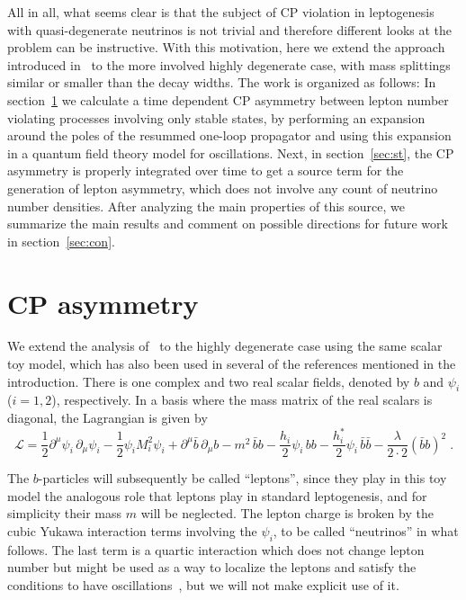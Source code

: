 \documentclass[11pt,a4paper]{article}
\begin{document}
All in all, what seems clear is that the subject of CP violation in leptogenesis with quasi-degenerate neutrinos is not trivial and therefore different looks at the problem can be instructive. With this motivation, here we extend the approach introduced in~\cite{Racker20} to the more involved highly degenerate case, with mass splittings similar or smaller than the decay widths. The work is organized as follows: In section~\ref{sec:toymodel} we calculate a time dependent CP asymmetry between lepton number violating processes involving only stable states, by performing an expansion around the poles of the resummed one-loop propagator and using this expansion in a quantum field theory model for oscillations. Next, in section~\ref{sec:st}, the CP asymmetry is properly integrated over time to get a source term for the generation of lepton asymmetry, which does not involve any count of neutrino number densities. After analyzing the main properties of this source, we summarize the main results and comment on possible directions for future work in section~\ref{sec:con}.
 

\section{CP asymmetry}
\label{sec:toymodel}
We extend the analysis of~\cite{Racker20} to the highly degenerate case using the same  scalar toy model, which has also been used in several of the references mentioned in the introduction. There is one complex and two real scalar fields, denoted by $b$ and $\psi_i$ ($i=1,2$), respectively. In a basis where the mass matrix of the real scalars is diagonal,
the Lagrangian is given by
\begin{equation}
\label{equation_lag}
\mathcal{L} = \frac{1}{2} \partial^\mu \psi_i \, \partial_\mu \psi_i - \frac{1}{2} \psi_i M_i^2 \psi_i +  \partial^\mu \bar b \, \partial_\mu b - m^2 \, \bar b b - \frac{h_i}{2} \psi_i \, b b - \frac{h_i^*}{2} \psi_i \, \bar b \bar b - \frac{\lambda}{2\cdot 2}(\bar b b)^2 \; .
\end{equation}

The $b$-particles will subsequently be called ``leptons'', since they play in this toy model the analogous role that leptons play in standard leptogenesis, and for simplicity their mass $m$ will be neglected. The lepton charge is broken by the cubic Yukawa interaction terms involving the $\psi_i$, to be called ``neutrinos'' in what follows. The last term is a quartic interaction which does not change lepton number but might be used as a way to localize the leptons and satisfy the conditions to have oscillations~\cite{Beuthe01}, but we will not make explicit use of it. 
\end{document}
